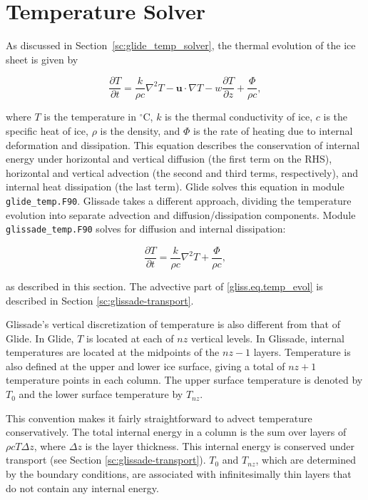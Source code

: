 
\section{Temperature Solver}
\label{sc:glissade-temperature}

As discussed in Section~\ref{sc:glide_temp_solver}, the thermal evolution of the ice sheet is given by

\begin{equation}
  \label{gliss.eq.temp_evol}
  \frac{\partial T}{\partial t} = 
  \frac{k}{\rho c} {{\nabla }^{2}}T - \mathbf{u} \cdot \nabla T - w\frac{\partial T}{\partial z} + \frac{\Phi }{\rho c},
\end{equation}

\noindent
where $T$ is the temperature in $^\circ$C, $k$ is the thermal conductivity of ice, $c$ is the specific heat of ice, 
$\rho$ is the density, and $\Phi$ is the rate of heating due to internal deformation and dissipation.
This equation describes the conservation of internal energy under horizontal and vertical 
diffusion (the first term on the RHS), horizontal and vertical advection 
(the second and third terms, respectively), and internal heat dissipation (the last term).
Glide solves this equation in module {\tt glide\_temp.F90}.
Glissade takes a different approach, dividing the temperature evolution into 
separate advection and diffusion/dissipation components.
Module {\tt glissade\_temp.F90} solves for diffusion and internal dissipation:

\begin{equation}
  \label{gliss.eq.vert_temp_evol}
  \frac{\partial T}{\partial t} = \frac{k}{\rho c}{{\nabla }^{2}}T + \frac{\Phi }{\rho c},
\end{equation}

\noindent
as described in this section.
The advective part of \eqref{gliss.eq.temp_evol} is described
in Section \ref{sc:glissade-transport}.

Glissade's vertical discretization of temperature is also different from that of Glide.
In Glide, $T$ is located at each of $nz$ vertical levels.
In Glissade, internal temperatures are located at the midpoints of the $nz-1$ layers.
Temperature is also defined at the upper and lower ice surface, giving a total
of $nz+1$ temperature points in each column.  The upper surface temperature is denoted
by $T_0$ and the lower surface temperature by $T_{nz}.$

This convention makes it fairly straightforward
to advect temperature conservatively.  The total internal energy in a column 
is the sum over layers of $\rho c T \Delta z$, where $\Delta z$ is the layer thickness.
This internal energy is conserved under transport (see Section \ref{sc:glissade-transport}).
$T_0$ and $T_{nz}$, which are determined by the boundary conditions, 
are associated with infinitesimally thin layers that do not contain
any internal energy.

